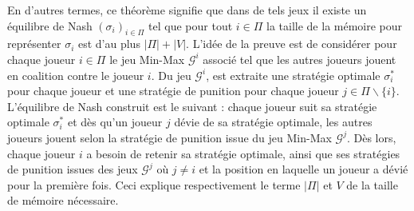 En d'autres termes, ce théorème signifie que dans de tels jeux il existe un équilibre de Nash $(\sigma_i)_{i\in \Pi}$ tel que pour tout $i \in \Pi$ la taille de la mémoire pour représenter $\sigma_i$ est d'au plus $|\Pi| + |V|$. L'idée de la preuve est de considérer  pour chaque joueur $i \in \Pi$ le jeu Min-Max $\mathcal{G}^i$ associé tel que les autres joueurs jouent en coalition contre le joueur $i$. Du jeu $\mathcal{G}^i$, est extraite une stratégie optimale $\sigma_i^*$ pour chaque joueur et une stratégie de punition pour chaque joueur $j \in \Pi \backslash \{i\}$. L'équilibre de Nash construit est le suivant : chaque joueur suit sa stratégie optimale $\sigma_i^*$ et dès qu'un joueur $j$ dévie de sa stratégie optimale, les autres joueurs jouent selon la stratégie de punition issue du jeu Min-Max $\mathcal{G}^j$. Dès lors, chaque joueur $i$ a besoin de retenir sa stratégie optimale, ainsi que ses stratégies de punition issues des jeux $\mathcal{G}^j$ où $j \neq i$ et la position en laquelle un joueur a dévié pour la première fois. Ceci explique respectivement le terme $|\Pi|$ et $V$ de la taille de mémoire nécessaire.
